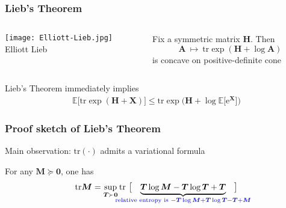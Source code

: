 \documentclass[compress,
mathserif,wide,%
]{beamer}
\begin{document}
\begin{frame}
\frametitle{Lieb's Theorem}



\begin{columns}

\begin{column}{0.25\textwidth}

\begin{center}
\texttt{[image: Elliott-Lieb.jpg]} \\
	{\small Elliott Lieb}
\end{center}

\end{column}

\begin{column}{0.6\textwidth}

\begin{theorem}[Lieb\,'73]
	\label{thm:Lieb}
	Fix a symmetric matrix $\bm{H}$. Then 
	\[
		\bm{A}~\mapsto~\mathrm{tr}\exp(\bm{H}+\log\bm{A})
	\]
	is concave on positive-definite cone
\end{theorem}

\end{column}
\end{columns}


\vfill

Lieb's Theorem immediately implies  
%
\begin{align}
	\label{eq:Lieb-corollary}
	\mathbb{E}\big[\mathrm{tr}\exp(\bm{H}+\bm{X})\big]\leq\mathrm{tr}\exp\big(\bm{H}+\log\mathbb{E}\big[\mathrm{e}^{\bm{X}}\big]\big)
\end{align}
%


\end{frame}





\begin{frame}
	\frametitle{Proof sketch of Lieb's Theorem}


Main observation: $\mathrm{tr}(\cdot)$ admits a variational formula

\bigskip

\begin{lemma}
	\label{lem:trace-variational}
	For any $\bm{M}\succeq \bm{0}$, one has
	\vspace{-0.5em}
	\begin{align*}
		\mathrm{tr} \bm{M} = \sup_{\bm{T}\succ \bm{0}}  \mathrm{tr}~\big[ \hspace{-2em} \underset{\alertb{\text{relative entropy is }- \bm{T} \log \bm{M} + \bm{T} \log \bm{T} - \bm{T} + \bm{M}}}{\underbrace{ \bm{T} \log \bm{M} - \bm{T} \log \bm{T} + \bm{T} }} \hspace{-2em}\big]
	\end{align*}
\end{lemma}


\end{frame}
\end{document}
